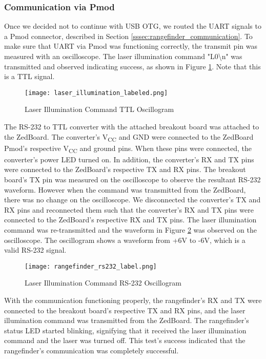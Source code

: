 \subsubsection{Communication via Pmod}
Once we decided not to continue with USB OTG, we routed the UART signals to a Pmod connector, described in Section \ref{sssec:rangefinder_communication}. To make sure that UART via Pmod was functioning correctly, the transmit pin was measured with an oscilloscope. The laser illumination command "L0\textbackslash{}n" was transmitted and observed indicating success, as shown in Figure \ref{laser_illumination}. Note that this is a TTL signal.

\begin{figure}[H]
	\centerline{\texttt{[image: laser\_illumination\_labeled.png]}}
	\caption{Laser Illumination Command TTL Oscillogram}
	\label{laser_illumination}
\end{figure}

The RS-232 to TTL converter with the attached breakout board was attached to the ZedBoard. The converter's V\textsubscript{CC} and GND were connected to the ZedBoard Pmod's respective V\textsubscript{CC} and ground pins. When these pins were connected, the converter's power LED turned on. In addition, the converter's RX and TX pins were connected to the ZedBoard's respective TX and RX pins. The breakout board's TX pin was measured on the oscilloscope to observe the resultant RS-232 waveform. However when the command was transmitted from the ZedBoard, there was no change on the oscilloscope. We disconnected the converter's TX and RX pins and reconnected them such that the converter's RX and TX pins were connected to the ZedBoard's respective RX and TX pins. The laser illumination command was re-transmitted and the waveform in Figure \ref{rangefinder_rs232} was observed on the oscilloscope. The oscillogram shows a waveform from +6V to -6V, which is a valid RS-232 signal.

\begin{figure}[H]
	\centerline{\texttt{[image: rangefinder\_rs232\_label.png]}}
	\caption{Laser Illumination Command RS-232 Oscillogram}
	\label{rangefinder_rs232}
\end{figure}

With the communication functioning properly, the rangefinder's RX and TX were connected to the breakout board's respective TX and RX pins, and the laser illumination command was transmitted from the ZedBoard. The rangefinder's status LED started blinking, signifying that it received the laser illumination command and the laser was turned off. This test's success indicated that the rangefinder's communication was completely successful.

